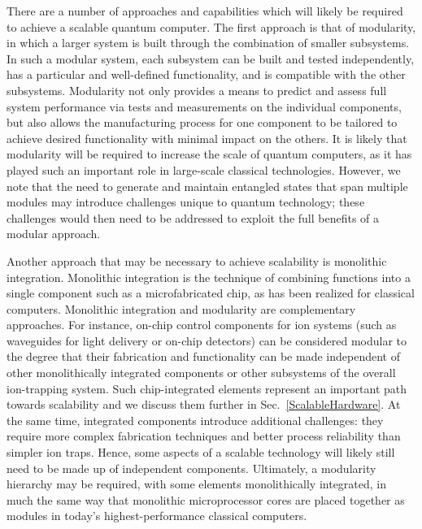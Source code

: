 \documentclass[%
reprint,
 amsmath,amssymb,
]{revtex4-1}
\begin{document}
There are a number of approaches and capabilities which will likely be required to achieve a scalable quantum computer.  The first approach is that of modularity, in which a larger system is built through the combination of smaller subsystems.  In such a modular system, each subsystem can be built and tested independently, has a particular and well-defined functionality, and is compatible with the other subsystems. Modularity not only provides a means to predict and assess full system performance via tests and measurements on the individual components, but also allows the manufacturing process for one component to be tailored to achieve desired functionality with minimal impact on the others.  It is likely that modularity will be required to increase the scale of quantum computers, as it has played such an important role in large-scale classical technologies.  However, we note that the need to generate and maintain entangled states that span multiple modules may introduce challenges unique to quantum technology; these challenges would then need to be addressed to exploit the full benefits of a modular approach.

Another approach that may be necessary to achieve scalability is monolithic integration.  Monolithic integration is the technique of combining functions into a single component such as a microfabricated chip, as has been realized for classical computers.  Monolithic integration and modularity are complementary approaches.  For instance, on-chip control components for ion systems (such as waveguides for light delivery or on-chip detectors) can be considered modular to the degree that their fabrication and functionality can be made independent of other monolithically integrated components or other subsystems of the overall ion-trapping system. Such chip-integrated elements represent an important path towards scalability and we discuss them further in Sec.~\ref{ScalableHardware}. At the same time, integrated components introduce additional challenges: they require more complex fabrication techniques and better process reliability than simpler ion traps. Hence, some aspects of a scalable technology will likely still need to be made up of independent components. Ultimately, a modularity hierarchy may be required, with some elements monolithically integrated, in much the same way that monolithic microprocessor cores are placed together as modules in today's highest-performance classical computers.
\end{document}
